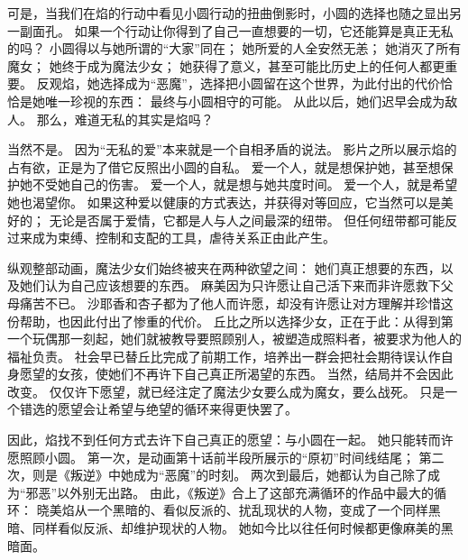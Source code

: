 可是，当我们在焰的行动中看见小圆行动的扭曲倒影时，小圆的选择也随之显出另一副面孔。
如果一个行动让你得到了自己一直想要的一切，它还能算是真正无私的吗？
小圆得以与她所谓的“大家”同在；
她所爱的人全安然无恙；
她消灭了所有魔女；
她终于成为魔法少女；
她获得了意义，甚至可能比历史上的任何人都更重要。
反观焰，她选择成为“恶魔”，选择把小圆留在这个世界，为此付出的代价恰恰是她唯一珍视的东西：
最终与小圆相守的可能。
从此以后，她们迟早会成为敌人。
那么，难道无私的其实是焰吗？

当然不是。
因为“无私的爱”本来就是一个自相矛盾的说法。
影片之所以展示焰的占有欲，正是为了借它反照出小圆的自私。
爱一个人，就是想保护她，甚至想保护她不受她自己的伤害。
爱一个人，就是想与她共度时间。
爱一个人，就是希望她也渴望你。
如果这种爱以健康的方式表达，并获得对等回应，它当然可以是美好的；
无论是否属于爱情，它都是人与人之间最深的纽带。
但任何纽带都可能反过来成为束缚、控制和支配的工具，虐待关系正由此产生。

纵观整部动画，魔法少女们始终被夹在两种欲望之间：
她们真正想要的东西，以及她们认为自己应该想要的东西。
麻美因为只许愿让自己活下来而非许愿救下父母痛苦不已。
沙耶香和杏子都为了他人而许愿，却没有许愿让对方理解并珍惜这份帮助，也因此付出了惨重的代价。
丘比之所以选择少女，正在于此：从得到第一个玩偶那一刻起，她们就被教导要照顾别人，被塑造成照料者，被要求为他人的福祉负责\cite{ref119}。
社会早已替丘比完成了前期工作，培养出一群会把社会期待误认作自身愿望的女孩，使她们不再许下自己真正所渴望的东西。
当然，结局并不会因此改变。
仅仅许下愿望，就已经注定了魔法少女要么成为魔女，要么战死。
只是一个错选的愿望会让希望与绝望的循环来得更快罢了。

因此，焰找不到任何方式去许下自己真正的愿望：与小圆在一起。
她只能转而许愿照顾小圆。
第一次，是动画第十话前半段所展示的“原初”时间线结尾；
第二次，则是《叛逆》中她成为“恶魔”的时刻。
两次到最后，她都认为自己除了成为“邪恶”以外别无出路。
由此，《叛逆》合上了这部充满循环的作品中最大的循环：
晓美焰从一个黑暗的、看似反派的、扰乱现状的人物，变成了一个同样黑暗、同样看似反派、却维护现状的人物。
她如今比以往任何时候都更像麻美的黑暗面。
